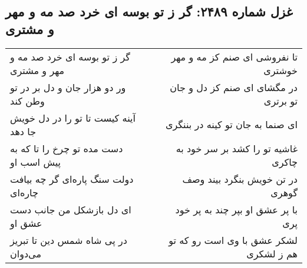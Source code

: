 \begin{center}
\section*{غزل شماره ۲۴۸۹: گر ز تو بوسه ای خرد صد مه و مهر و مشتری}
\label{sec:2489}
\begin{longtable}{l p{0.5cm} r}
گر ز تو بوسه ای خرد صد مه و مهر و مشتری
&&
تا نفروشی ای صنم کز مه و مهر خوشتری
\\
ور دو هزار جان و دل بر در تو وطن کند
&&
در مگشای ای صنم کز دل و جان تو برتری
\\
آینه کیست تا تو را در دل خویش جا دهد
&&
ای صنما به جان تو کینه در بننگری
\\
دست مده تو چرخ را تا که به پیش اسب او
&&
غاشیه تو را کشد بر سر خود به چاکری
\\
دولت سنگ پاره‌ای گر چه بیافت چاره‌ای
&&
در تن خویش بنگرد بیند وصف گوهری
\\
ای دل بازشکل من جانب دست عشق او
&&
با پر عشق او بپر چند به پر خود پری
\\
در پی شاه شمس دین تا تبریز می‌دوان
&&
لشکر عشق با وی است رو که تو هم ز لشکری
\\
\end{longtable}
\end{center}
